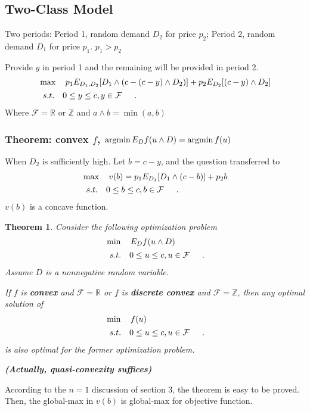 \documentclass[11pt,a4paper]{article}
\newcommand{\argmin}{\operatornamewithlimits{argmin}}
\newtheorem{theorem}{Theorem}
\begin{document}
\subsection{Two-Class Model}
Two periods: Period 1, random demand $D_2$ for price $p_2$; Period 2, random demand $D_1$ for price $p_1$. $p_1>p_2$

Provide $y$ in period 1 and the remaining will be provided in period 2.
\begin{align*}
    &\max\quad p_1E_{D_1,D_2}[D_1\wedge (c-(c-y)\wedge D_2)]+p_2E_{D_2}[(c-y)\wedge D_2]\\
    &\begin{array}{r@{\quad}r@{}l@{\quad}l}
    s.t.
    &0\leq y\leq c&,y\in \mathcal{F} &\\
\end{array} .
\end{align*}
Where $\mathcal{F}=\mathbb{R}$ or $\mathbb{Z}$ and $a\wedge b=\min(a,b)$

\subsubsection{Theorem: convex $f$, $\argmin E_{D}f(u\wedge D)=\argmin f(u)$}
When $D_2$ is sufficiently high. Let $b=c-y$, and the question transferred to
\begin{align*}
    &\max\quad v(b)=p_1E_{D_1}[D_1\wedge (c-b)]+p_2b\\
    &\begin{array}{r@{\quad}r@{}l@{\quad}l}
    s.t.
    &0\leq b\leq c&,b\in \mathcal{F} &\\
\end{array} .
\end{align*}
$v(b)$ is a concave function.

\begin{theorem}
Consider the following optimization problem
\begin{align*}
    &\min\quad E_{D}f(u\wedge D)\\
    &\begin{array}{r@{\quad}r@{}l@{\quad}l}
    s.t.
    &0\leq u\leq c&,u\in \mathcal{F} &\\
\end{array} .
\end{align*}
Assume $D$ is a nonnegative random variable.

If $f$ is \textbf{convex} and $\mathcal{F}=\mathbb{R}$ or $f$ is \textbf{discrete convex} and $\mathcal{F}=\mathbb{Z}$, then any optimal solution of
\begin{align*}
    &\min\quad f(u)\\
    &\begin{array}{r@{\quad}r@{}l@{\quad}l}
    s.t.
    &0\leq u\leq c&,u\in \mathcal{F} &\\
\end{array} .
\end{align*}
is also optimal for the former optimization problem.

\textbf{(Actually, quasi-convexity suffices)}
\end{theorem}
According to the $n=1$ discussion of section 3, the theorem is easy to be proved. Then, the global-max in $v(b)$ is global-max for objective function.
\end{document}
